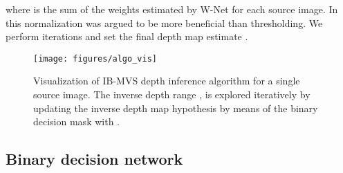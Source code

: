 \documentclass{bmvc2k}
\begin{document}
where  is the sum of the weights estimated by W-Net for each source image. In~\cite{vismvsnet} this normalization was argued to be more beneficial than thresholding.
We perform  iterations and set the final depth map estimate .
\begin{figure}[t]
\centering
\texttt{[image: figures/algo\_vis]}
\caption{
Visualization of IB-MVS depth inference algorithm for a single source image.
The inverse depth range ,  is explored iteratively by updating the inverse depth map hypothesis  by means of the binary decision mask  with .
\vspace{-10pt}
}
\label{fig_algo_vis}
\end{figure}

\subsection{Binary decision network}
\end{document}
